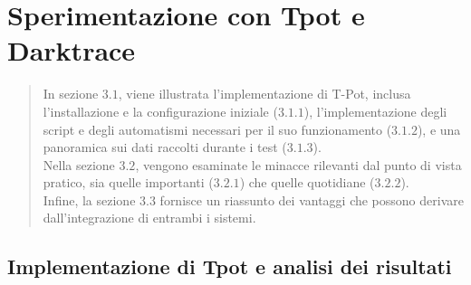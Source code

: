 \chapter{Sperimentazione con Tpot e Darktrace}
\begin{quote}
	{\small In sezione $3.1$, viene illustrata l'implementazione di T-Pot, inclusa l'installazione e la configurazione iniziale ($3.1.1$), l'implementazione degli script e degli automatismi necessari per il suo funzionamento ($3.1.2$), e una panoramica sui dati raccolti durante i test ($3.1.3$).\\
	Nella sezione $3.2$, vengono esaminate le minacce rilevanti dal punto di vista pratico, sia quelle importanti ($3.2.1$) che quelle quotidiane ($3.2.2$).\\
	Infine, la sezione $3.3$ fornisce un riassunto dei vantaggi che possono derivare dall'integrazione di entrambi i sistemi.}
\end{quote} 
\section{Implementazione di Tpot e analisi dei risultati}
